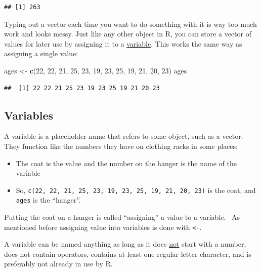 \documentclass[
]{book}
\newenvironment{Shaded}{\begin{snugshade}}{\end{snugshade}}
\newcommand{\DecValTok}[1]{\textcolor[rgb]{0.00,0.00,0.81}{#1}}
\newcommand{\FunctionTok}[1]{\textcolor[rgb]{0.13,0.29,0.53}{\textbf{#1}}}
\newcommand{\NormalTok}[1]{#1}
\newcommand{\OtherTok}[1]{\textcolor[rgb]{0.56,0.35,0.01}{#1}}
\begin{document}
\begin{verbatim}
## [1] 263
\end{verbatim}

Typing out a vector each time you want to do something with it is way too much work and looks messy. Just like any other object in R, you can store a vector of values for later use by assigning it to a \ul{variable}. This works the same way as assigning a single value:

\begin{Shaded}
\begin{Highlighting}[]
\NormalTok{ages }\OtherTok{\textless{}{-}} \FunctionTok{c}\NormalTok{(}\DecValTok{22}\NormalTok{, }\DecValTok{22}\NormalTok{, }\DecValTok{21}\NormalTok{, }\DecValTok{25}\NormalTok{, }\DecValTok{23}\NormalTok{, }\DecValTok{19}\NormalTok{, }\DecValTok{23}\NormalTok{, }\DecValTok{25}\NormalTok{, }\DecValTok{19}\NormalTok{, }\DecValTok{21}\NormalTok{, }\DecValTok{20}\NormalTok{, }\DecValTok{23}\NormalTok{)}
\NormalTok{ages}
\end{Highlighting}
\end{Shaded}

\begin{verbatim}
##  [1] 22 22 21 25 23 19 23 25 19 21 20 23
\end{verbatim}

\subsection{Variables}\label{variables}

A variable is a placeholder name that refers to some object, such as a vector. They function like the numbers they have on clothing racks in some places:

\begin{itemize}
\item
  The coat is the value and the number on the hanger is the name of the variable
\item
  So, \texttt{c(22,\ 22,\ 21,\ 25,\ 23,\ 19,\ 23,\ 25,\ 19,\ 21,\ 20,\ 23)} is the coat, and \texttt{ages} is the ``hanger''.
\end{itemize}

Putting the coat on a hanger is called ``assigning'' a value to a variable.~ As mentioned before assigning value into variables is done with \texttt{\textless{}-}.

A variable can be named anything as long as it does \ul{not} start with a number, does not contain operators, contains at least one regular letter character, and is preferably not already in use by R.
\end{document}
